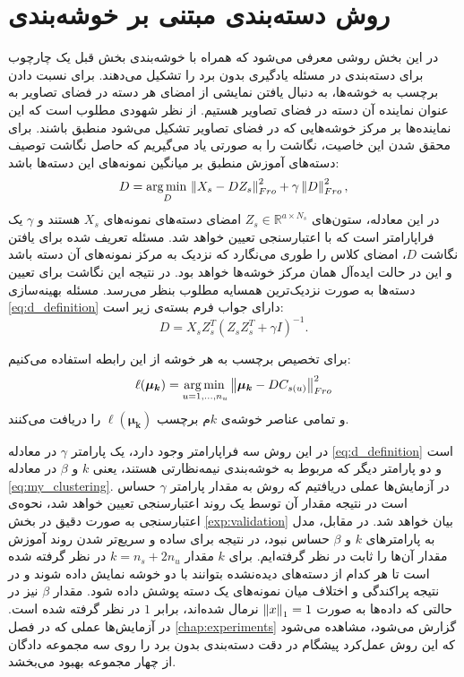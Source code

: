 \section{روش دسته‌بندی مبتنی بر خوشه‌بندی} \label{simple_method}
در این بخش روشی معرفی می‌شود که همراه با خوشه‌بندی بخش قبل یک چارچوب برای دسته‌بندی در مسئله یادگیری بدون برد را تشکیل می‌دهند. برای نسبت دادن برچسب به خوشه‌ها، به دنبال یافتن نمایشی از امضای هر دسته در فضای تصاویر به عنوان نماینده آن دسته در فضای تصاویر هستیم. از نظر شهودی مطلوب است که این نماینده‌ها بر مرکز خوشه‌هایی که در فضای تصاویر تشکیل می‌شود منطبق باشند. برای محقق شدن این خاصیت، نگاشت را به صورتی یاد می‌گیریم که حاصل نگاشت توصیف دسته‌های آموزش منطبق بر میانگین نمونه‌های این دسته‌ها باشد:
\begin{equation} \label{eq:d_definition}
  D = \operatorname*{arg\,min\,}_D \left \lVert X_s - D Z_s \right \rVert_{Fro}^2 + \gamma \left \lVert D \right \rVert_{Fro}^2,
\end{equation}
در این معادله، ستون‌های
 $Z_s \in \mathbb{R}^{a \times N_s}$
  امضای دسته‌های نمونه‌های $X_s$ هستند و $\gamma$ یک فراپارامتر است که با اعتبارسنجی تعیین خواهد شد. مسئله تعریف شده برای یافتن نگاشت $D$، امضای کلاس را طوری می‌نگارد که نزدیک به مرکز نمونه‌های آن دسته باشد و این در حالت ایده‌آل همان مرکز خوشه‌ها خواهد بود. در نتیجه این نگاشت برای تعیین دسته‌ها به صورت نزدیک‌ترین همسایه مطلوب بنظر می‌رسد. مسئله بهینه‌سازی
  \eqref{eq:d_definition}
  دارای جواب فرم بسته‌ی زیر است:
  \begin{equation} \label{eq:d_answer}
  D = X_s Z_s^T (Z_s Z_s^T + \gamma I)^{-1}.
\end{equation}

برای تخصیص برچسب به هر خوشه از این رابطه استفاده می‌کنیم:
\begin{equation}
\label{eq:simple_assignment}
\ell(\boldsymbol{\mu_k}) = \operatorname*{arg\,min\,}_{u=1,\ldots,n_u} \left \lVert \boldsymbol{\mu_k} - DC_{s(u)} \right \rVert_{Fro}^2
\end{equation}
و تمامی عناصر خوشه‌ی $k$م برچسب $\ell(\boldsymbol{\mu_k})$ را دریافت می‌کنند.

در این روش سه فراپارامتر وجود دارد، یک پارامتر $\gamma$ در معادله
\eqref{eq:d_definition}
است و دو پارامتر دیگر که مربوط به خوشه‌بندی نیمه‌نظارتی هستند، یعنی $k$ و $\beta$ در معادله
\eqref{eq:my_clustering}.
در آزمایش‌ها عملی دریافتیم که روش به مقدار پارامتر $\gamma$ حساس است در نتیجه مقدار آن توسط یک روند اعتبارسنجی تعیین خواهد شد، نحوه‌ی اعتبارسنجی به صورت دقیق در بخش
\ref{exp:validation}
بیان خواهد شد. در مقابل، مدل به پارامترهای $k$ و $\beta$ حساس نبود، در نتیجه برای ساده و سریع‌تر شدن روند آموزش مقدار آن‌ها را ثابت در نظر گرفته‌ایم. برای $k$ مقدار
$k = n_s + 2n_u$
در نظر گرفته شده است تا هر کدام از دسته‌های دیده‌نشده بتوانند با دو خوشه نمایش داده شوند و در نتیجه پراکندگی و اختلاف میان نمونه‌های یک دسته پوشش داده شود. مقدار $\beta$ نیز در حالتی که داده‌ها به صورت $\left \lVert x \right \rVert_1=1$ نرمال شده‌اند، برابر $1$ در نظر گرفته شده است.
در آزمایش‌ها عملی که در فصل
\ref{chap:experiments}
گزارش می‌شود، مشاهده می‌شود که این روش  عمل‌کرد پیشگام در دقت دسته‌بندی بدون برد را روی سه مجموعه دادگان از چهار مجموعه بهبود می‌بخشد.

